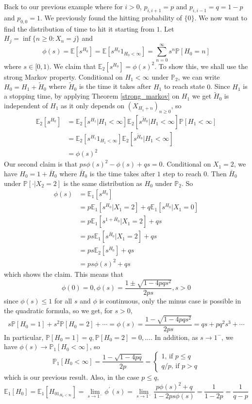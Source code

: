 \begin{example}
    Back to our previous example where for $i>0$, $p_{i,i+1}=p$ and $p_{i,i-1}=q=1-p$ and $p_{0,0}=1$.
    We previously found the hitting probability of $\{0\}$.
    We now want to find the distribution of time to hit it starting from $1$.
    Let $H_j=\inf\{n\ge 0:X_n=j\}$ and
    $$\phi(s)=\mathbb E[s^{H_0}]=\mathbb E[s^{H_0}1_{H_0<\infty}]=\sum_{n=0}^\infty s^n\mathbb P[H_0=n]$$
    where $s\in [0,1)$.
    We claim that $\mathbb E_2[s^{H_0}]=\phi(s)^2$.
    To show this, we shall use the strong Markov property.
    Conditional on $H_1<\infty$ under $\mathbb P_2$, we can write $H_0=H_1+\tilde{H}_0$ where $\tilde{H}_0$ is the time it takes after $H_1$ to reach state $0$.
    Since $H_1$ is a stopping time, by applying Theorem \ref{strong_markov} on $H_1$ we get $\tilde{H}_0$ is independent of $H_1$ as it only depends on $(X_{H_1+n})_{n\ge 0}$, so
    \begin{align*}
        \mathbb E_2[s^{H_0}]&=\mathbb E_2[s^{H_1}|H_1<\infty]\mathbb E_2[s^{\tilde{H}_0}|H_1<\infty]\mathbb P[H_1<\infty]\\
        &=\mathbb E_2[s^{H_1}1_{H_1<\infty}]\mathbb E_2[s^{\tilde{H}_0}|H_1<\infty]\\
        &=\phi(s)^2
    \end{align*}
    Our second claim is that $ps\phi(s)^2-\phi(s)+qs=0$.
    Conditional on $X_1=2$, we have $H_0=1+\bar{H}_0$ where $\bar{H}_0$ is the time takes after $1$ step to reach $0$.
    Then $\bar{H}_0$ under $\mathbb P[\cdot|X_2=2]$ is the same distribution as $H_0$ under $\mathbb P_2$.
    So
    \begin{align*}
        \phi(s)&=\mathbb E_1[s^{H_0}]\\
        &=p\mathbb E_1[s^{H_0}|X_1=2]+q\mathbb E_1[s^{H_0}|X_1=0]\\
        &=p\mathbb E_1[s^{1+\bar{H}_0}|X_1=2]+qs\\
        &=ps\mathbb E_1[s^{\bar{H}_0}|X_1=2]+qs\\
        &=ps\mathbb E_2[s^{H_0}]+qs\\
        &=ps\phi(s)^2+qs
    \end{align*}
    which shows the claim.
    This means that
    $$\phi(0)=0,\phi(s)=\frac{1\pm\sqrt{1-4pqs^2}}{2ps},s>0$$
    since $\phi(s)\le 1$ for all $s$ and $\phi$ is continuous, only the minus case is possible in the quadratic formula, so we get, for $s>0$,
    $$s\mathbb P[H_0=1]+s^2\mathbb P[H_0=2]+\cdots=\phi(s)=\frac{1-\sqrt{1-4pqs^2}}{2ps}=qs+pq^2s^3+\cdots$$
    In particular, $\mathbb P[H_0=1]=q,\mathbb P[H_0=2]=0,\ldots$.
    In addition, as $s\to 1^-$, we have $\phi(s)\to\mathbb P_1[H_0<\infty]$, so
    $$\mathbb P_1[H_0<\infty]=\frac{1-\sqrt{1-4pq}}{2p}=\begin{cases}
        1\text{, if $p\le q$}\\
        q/p\text{, if $p>q$}
    \end{cases}$$
    which is our previous result.
    Also, in the case $p\le q$,
    $$\mathbb E_1[H_0]=\mathbb E_1[H_01_{H_0<\infty}]=\lim_{s\to 1^-}\phi^\prime(s)=\lim_{s\to 1^-}\frac{p\phi(s)^2+q}{1-2ps\phi(s)}=\frac{1}{1-2p}=\frac{1}{q-p}$$
\end{example}